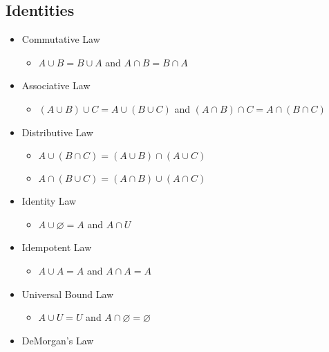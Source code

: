 \documentclass[landscape, letterpaper, 8pt]{extarticle}
\begin{document}
\begin{multicols}{3}
    \subsection*{Identities}
    \begin{itemize}[noitemsep,nolistsep]
        \item Commutative Law
              \begin{itemize}[noitemsep,nolistsep]
                  \item $A \cup B = B \cup A $ and $A \cap B = B \cap A$
              \end{itemize}
        \item Associative Law
              \begin{itemize}[noitemsep,nolistsep]
                  \item $(A \cup B) \cup C = A \cup (B \cup C)$ and $(A \cap B) \cap C = A \cap (B \cap C)$
              \end{itemize}
        \item Distributive Law
              \begin{itemize}[noitemsep,nolistsep]
                  \item $A \cup (B \cap C) = (A \cup B) \cap (A \cup C)$
                  \item $A \cap (B \cup C) = (A \cap B) \cup (A \cap C)$
              \end{itemize}
        \item Identity Law
              \begin{itemize}[noitemsep,nolistsep]
                  \item $A \cup \varnothing = A$ and $A \cap U$
              \end{itemize}
        \item Idempotent Law
              \begin{itemize}[noitemsep,nolistsep]
                  \item $A \cup A = A$ and $A\cap A = A$
              \end{itemize}
        \item Universal Bound Law
              \begin{itemize}[noitemsep,nolistsep]
                  \item $A \cup U = U$ and $A  \cap \varnothing = \varnothing$
              \end{itemize}
        \item DeMorgan's Law
              \begin{itemize}

\end{itemize}
\end{itemize}
\end{multicols}
\end{document}
